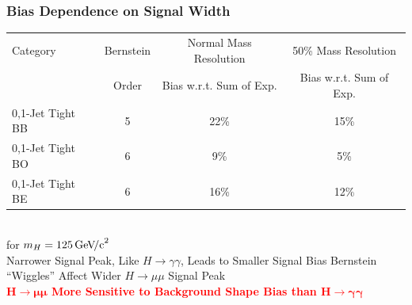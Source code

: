 \documentclass{beamer}
\newcommand{\GeVcc}{\ensuremath{\,\mathrm{Ge\kern -0.1em V\!/c}^2}}
\newcommand{\tredbf}[1]{\textcolor{red}{\bf #1}}
\begin{document}
\begin{frame}
\frametitle{Bias Dependence on Signal Width}
  \begin{center}
    \scriptsize
    \begin{tabular}{|l|c|c|c|} \hline
Category & Bernstein & Normal Mass Resolution & 50\% Mass Resolution \\
         & Order     & Bias w.r.t. Sum of Exp. &  Bias w.r.t. Sum of Exp. \\ \hline \hline
0,1-Jet Tight BB & 5 & 22\% & 15\% \\ \hline
0,1-Jet Tight BO & 6 & 9\%  &  5\% \\ \hline
0,1-Jet Tight BE & 6 & 16\% & 12\% \\ \hline
    \end{tabular}
    \\ for $m_H=125\GeVcc{}$
  \small
  \\ \vspace{1em}
  Narrower Signal Peak, Like $H\rightarrow\gamma\gamma$,
   Leads to Smaller Signal Bias
  Bernstein ``Wiggles'' Affect Wider $H\rightarrow\mu\mu$ Signal Peak
  \\ \vspace{1em}
  \tredbf{$\bm{H\rightarrow\mu\mu}$ More Sensitive to Background Shape Bias than $\bm{H\rightarrow\gamma\gamma}$}
  \end{center}
\end{frame}
\end{document}
